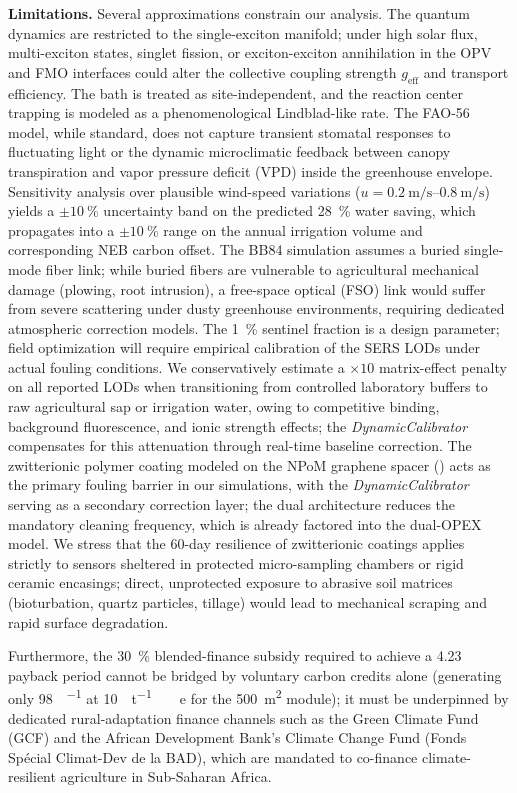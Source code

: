 \documentclass[onecolumn,a4paper,12pt]{article}
\begin{document}
\textbf{Limitations.} Several approximations constrain our analysis.
The quantum dynamics are restricted to the single-exciton manifold; under high solar flux, multi-exciton states, singlet fission, or exciton-exciton annihilation in the OPV and FMO interfaces could alter the collective coupling strength $g_{\mathrm{eff}}$ and transport efficiency.
The bath is treated as site-independent, and the reaction center trapping is modeled as a phenomenological Lindblad-like rate.
The FAO-56 model, while standard, does not capture transient stomatal responses to fluctuating light or the dynamic microclimatic feedback between canopy transpiration and vapor pressure deficit (VPD) inside the greenhouse envelope. Sensitivity analysis over plausible wind-speed variations ($u = \qtyrange{0.2}{0.8}{\m\per\s}$) yields a $\pm\qty{10}{\percent}$ uncertainty band on the predicted \qty{28}{\percent} water saving, which propagates into a $\pm\qty{10}{\percent}$ range on the annual irrigation volume and corresponding NEB carbon offset.
The BB84 simulation assumes a buried single-mode fiber link; while buried fibers are vulnerable to agricultural mechanical damage (plowing, root intrusion), a free-space optical (FSO) link would suffer from severe scattering under dusty greenhouse environments, requiring dedicated atmospheric correction models.
The \qty{1}{\percent} sentinel fraction is a design parameter; field optimization will require empirical calibration of the SERS LODs under actual fouling conditions. We conservatively estimate a $\times 10$ matrix-effect penalty on all reported LODs when transitioning from controlled laboratory buffers to raw agricultural sap or irrigation water, owing to competitive binding, background fluorescence, and ionic strength effects; the \textit{DynamicCalibrator} compensates for this attenuation through real-time baseline correction. The zwitterionic polymer coating modeled on the NPoM graphene spacer () acts as the primary fouling barrier in our simulations, with the \textit{DynamicCalibrator} serving as a secondary correction layer; the dual architecture reduces the mandatory cleaning frequency, which is already factored into the dual-OPEX model. We stress that the 60-day resilience of zwitterionic coatings applies strictly to sensors sheltered in protected micro-sampling chambers or rigid ceramic encasings; direct, unprotected exposure to abrasive soil matrices (bioturbation, quartz particles, tillage) would lead to mechanical scraping and rapid surface degradation.

Furthermore, the \qty{30}{\percent} blended-finance subsidy required to achieve a \qty{4.23}{\yr} payback period cannot be bridged by voluntary carbon credits alone (generating only \qty{98}{\USD\per\yr} at \qty{10}{\USD\per\tonne\ e} for the \qty{500}{\m\squared} module); it must be underpinned by dedicated rural-adaptation finance channels such as the Green Climate Fund (GCF) and the African Development Bank's Climate Change Fund (Fonds Sp\'{e}cial Climat-Dev de la BAD), which are mandated to co-finance climate-resilient agriculture in Sub-Saharan Africa.
\end{document}

